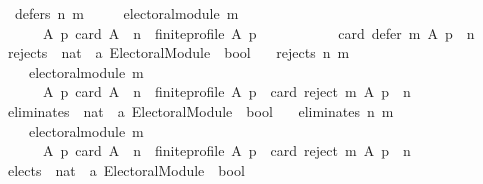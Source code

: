 \begin{isabellebody}
\ \ {\isachardoublequoteopen}defers\ n\ m\ {\isasymequiv}\isanewline
\ \ \ \ electoral{\isacharunderscore}{\kern0pt}module\ m\ {\isasymand}\isanewline
\ \ \ \ \ \ {\isacharparenleft}{\kern0pt}{\isasymforall}A\ p{\isachardot}{\kern0pt}\ {\isacharparenleft}{\kern0pt}card\ A\ {\isasymge}\ n\ {\isasymand}\ finite{\isacharunderscore}{\kern0pt}profile\ A\ p{\isacharparenright}{\kern0pt}\ {\isasymlongrightarrow}\isanewline
\ \ \ \ \ \ \ \ \ \ card\ {\isacharparenleft}{\kern0pt}defer\ m\ A\ p{\isacharparenright}{\kern0pt}\ {\isacharequal}{\kern0pt}\ n{\isacharparenright}{\kern0pt}{\isachardoublequoteclose}\isanewline
\isanewline
\isanewline
{}\isamarkupfalse%
\ rejects\ {\isacharcolon}{\kern0pt}{\isacharcolon}{\kern0pt}\ {\isachardoublequoteopen}nat\ {\isasymRightarrow}\ {\isacharprime}{\kern0pt}a\ Electoral{\isacharunderscore}{\kern0pt}Module\ {\isasymRightarrow}\ bool{\isachardoublequoteclose}\ \isanewline
\ \ {\isachardoublequoteopen}rejects\ n\ m\ {\isasymequiv}\isanewline
\ \ \ \ electoral{\isacharunderscore}{\kern0pt}module\ m\ {\isasymand}\isanewline
\ \ \ \ \ \ {\isacharparenleft}{\kern0pt}{\isasymforall}A\ p{\isachardot}{\kern0pt}\ {\isacharparenleft}{\kern0pt}card\ A\ {\isasymge}\ n\ {\isasymand}\ finite{\isacharunderscore}{\kern0pt}profile\ A\ p{\isacharparenright}{\kern0pt}\ {\isasymlongrightarrow}\ card\ {\isacharparenleft}{\kern0pt}reject\ m\ A\ p{\isacharparenright}{\kern0pt}\ {\isacharequal}{\kern0pt}\ n{\isacharparenright}{\kern0pt}{\isachardoublequoteclose}\isanewline
\isanewline
\isanewline
{}\isamarkupfalse%
\ eliminates\ {\isacharcolon}{\kern0pt}{\isacharcolon}{\kern0pt}\ {\isachardoublequoteopen}nat\ {\isasymRightarrow}\ {\isacharprime}{\kern0pt}a\ Electoral{\isacharunderscore}{\kern0pt}Module\ {\isasymRightarrow}\ bool{\isachardoublequoteclose}\ \isanewline
\ \ {\isachardoublequoteopen}eliminates\ n\ m\ {\isasymequiv}\isanewline
\ \ \ \ electoral{\isacharunderscore}{\kern0pt}module\ m\ {\isasymand}\isanewline
\ \ \ \ \ \ {\isacharparenleft}{\kern0pt}{\isasymforall}A\ p{\isachardot}{\kern0pt}\ {\isacharparenleft}{\kern0pt}card\ A\ {\isachargreater}{\kern0pt}\ n\ {\isasymand}\ finite{\isacharunderscore}{\kern0pt}profile\ A\ p{\isacharparenright}{\kern0pt}\ {\isasymlongrightarrow}\ card\ {\isacharparenleft}{\kern0pt}reject\ m\ A\ p{\isacharparenright}{\kern0pt}\ {\isacharequal}{\kern0pt}\ n{\isacharparenright}{\kern0pt}{\isachardoublequoteclose}\isanewline
\isanewline
\isanewline
{}\isamarkupfalse%
\ elects\ {\isacharcolon}{\kern0pt}{\isacharcolon}{\kern0pt}\ {\isachardoublequoteopen}nat\ {\isasymRightarrow}\ {\isacharprime}{\kern0pt}a\ Electoral{\isacharunderscore}{\kern0pt}Module\ {\isasymRightarrow}\ bool{\isachardoublequoteclose}\ \isanewline

\end{isabellebody}
